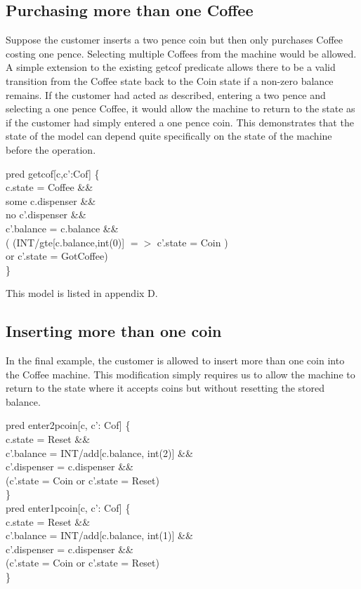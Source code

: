 \documentclass[a4paper,12pt]{extarticle}
\begin{document}
\subsection{Purchasing more than one Coffee}
\label{Purchasing more than one coffee}
Suppose the customer inserts a two pence coin but then only purchases Coffee costing one pence. Selecting multiple Coffees from the machine would be allowed. A simple extension to the existing getcof predicate allows there to be a valid transition from the Coffee state back to the Coin state if a non-zero balance remains. If the customer had acted as described, entering a two pence and selecting a one pence Coffee, it would allow the machine to return to the state as if the customer had simply entered a one pence coin. This demonstrates that the state of the model can depend quite specifically on the state of the machine before the operation.
\begin{algorithm}
pred getcof[c,c':Cof] \{ \\
c.state = Coffee \&\& \\
some c.dispenser \&\& \\
no c'.dispenser \&\& \\
c'.balance = c.balance \&\& \\
( (INT/gte[c.balance,int(0)] $=>$ c'.state = Coin )\\
or c'.state = GotCoffee)\\
\}\\
\end{algorithm}
This model is listed in appendix D.
\subsection{Inserting more than one coin}
\label{Inserting more than one coin}
In the final example, the customer is allowed to insert more than one coin into the Coffee machine. This modification simply requires us to allow the machine to return to the state where it accepts coins but without resetting the stored balance.
\begin{algorithm}
pred enter2pcoin[c, c': Cof] \{ \\

c.state = Reset \&\& \\
c'.balance = INT/add[c.balance, int(2)] \&\& \\
c'.dispenser = c.dispenser \&\& \\
(c'.state = Coin or c'.state = Reset)\\

\}\\
pred enter1pcoin[c, c': Cof] \{\\

c.state = Reset \&\& \\
c'.balance = INT/add[c.balance, int(1)] \&\& \\
c'.dispenser = c.dispenser \&\& \\
(c'.state = Coin or c'.state = Reset)\\

\}\\
\end{algorithm}
\end{document}
